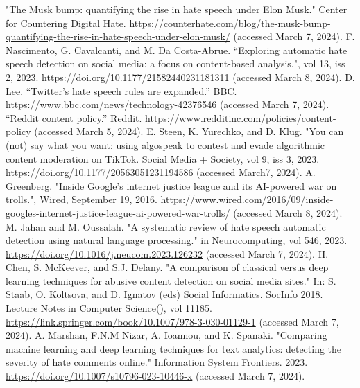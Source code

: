 \documentclass[conference]{IEEEtran}
\begin{document}
\begin{thebibliography}{00}

"The Musk bump: quantifying the rise in hate speech under Elon Musk." Center for Countering Digital Hate. \href{https://counterhate.com/blog/the-musk-bump-quantifying-the-rise-in-hate-speech-under-elon-musk}{https://counterhate.com/blog/the-musk-bump-quantifying-the-rise-in-hate-speech-under-elon-musk/} (accessed March 7, 2024).
F. Nascimento, G. Cavalcanti, and M. Da Costa-Abrue. “Exploring automatic hate speech detection on social media: a focus on content-based analysis.", vol 13, iss 2, 2023. \href{https://doi.org/10.1177/21582440231181311}{https://doi.org/10.1177/21582440231181311} (accessed March 8, 2024).
D. Lee. “Twitter's hate speech rules are expanded.” BBC. \href{https://www.bbc.com/news/technology-42376546}{https://www.bbc.com/news/technology-42376546} (accessed March 7, 2024).
 “Reddit content policy.” Reddit. \href{https://www.redditinc.com/policies/content-policy}{https://www.redditinc.com/policies/content-policy} (accessed March 5, 2024).
E. Steen, K. Yurechko, and D. Klug. "You can (not) say what you want: using algospeak to contest and evade algorithmic content moderation on TikTok. Social Media + Society, vol 9, iss 3, 2023. \href{https://doi.org/10.1177/20563051231194586}{https://doi.org/10.1177/20563051231194586} (accessed March7, 2024).
A. Greenberg. "Inside Google’s internet justice league and its AI-powered war on trolls.", Wired, September 19, 2016. https://www.wired.com/2016/09/inside-googles-internet-justice-league-ai-powered-war-trolls/ (accessed March 8, 2024).
M. Jahan and M. Oussalah. "A systematic review of hate speech automatic detection using natural language processing." in Neurocomputing, vol 546, 2023. \href{https://doi.org/10.1016/j.neucom.2023.126232}{https://doi.org/10.1016/j.neucom.2023.126232} (accessed March 7, 2024).
H. Chen, S. McKeever, and S.J. Delany. "A comparison of classical versus deep learning techniques for abusive content detection on social media sites." In: S. Staab, O. Koltsova, and D. Ignatov (eds) Social Informatics. SocInfo 2018. Lecture Notes in Computer Science(), vol 11185. \href{https://link.springer.com/book/10.1007/978-3-030-01129-1}{https://link.springer.com/book/10.1007/978-3-030-01129-1} (accessed March 7, 2024).
A. Marshan, F.N.M Nizar, A. Ioannou, and K. Spanaki. "Comparing machine learning and deep learning techniques for text analytics: detecting the severity of hate comments online." Information System Frontiers. 2023. \href{https://doi.org/10.1007/s10796-023-10446-x}{https://doi.org/10.1007/s10796-023-10446-x} (accessed March 7, 2024).

\end{thebibliography}
\end{document}
